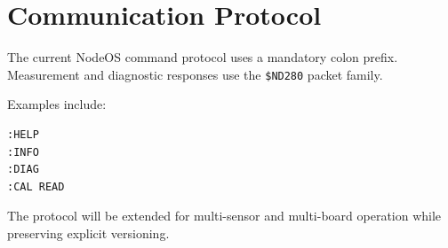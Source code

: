 \chapter{Communication Protocol}

The current NodeOS command protocol uses a mandatory colon prefix. Measurement and diagnostic responses use the \texttt{\$ND280} packet family.

Examples include:
\begin{verbatim}
:HELP
:INFO
:DIAG
:CAL READ
\end{verbatim}

The protocol will be extended for multi-sensor and multi-board operation while preserving explicit versioning.
